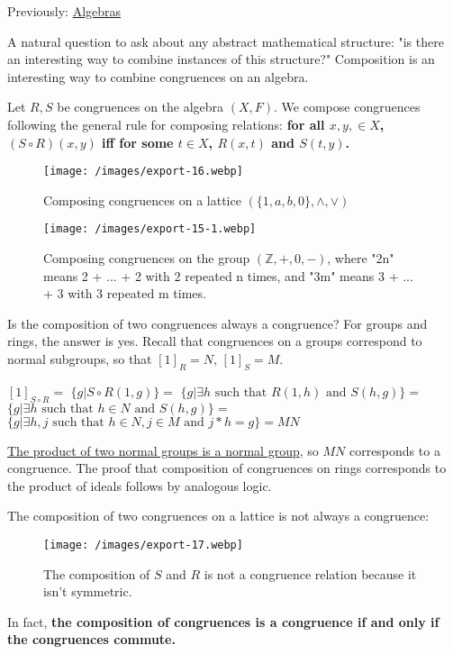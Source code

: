 \documentclass{article}
\begin{document}
Previously: \href{/posts/2021-04-02-congruences.html}{Algebras}

A natural question to ask about any abstract mathematical structure: "is there an interesting way to combine instances of this structure?" Composition is an interesting way to combine congruences on an algebra.

Let $R, S$ be congruences on the algebra $(X, F)$. We compose congruences following the general rule for composing relations: \textbf{for all $x, y, \in X$, $(S \circ R)(x, y)$ iff for some $t \in X$, $R(x, t)$ and $S(t, y)$.}

\begin{figure}
\texttt{[image: /images/export-16.webp]}
\caption{Composing congruences on a lattice $(\{1, a, b, 0\}, \land, \lor)$}
\end{figure}

\begin{figure}
\texttt{[image: /images/export-15-1.webp]}
\caption{Composing congruences on the group $(\mathbb{Z}, +, 0, -)$, where "2n" means 2 + ... + 2 with 2 repeated n times, and "3m" means 3 + ... + 3 with 3 repeated m times.}
\end{figure}

Is the composition of two congruences always a congruence? For groups and rings, the answer is yes. Recall that congruences on a groups correspond to normal subgroups, so that $[1]_R = N$, $[1]_S = M$.

$[1]_{S \circ R} =$
$\{g | S \circ R (1, g)\} =$
$\{g | \exists h \text{ such that } R(1, h) \text{ and } S(h, g)\} =$
$\{g | \exists h \text{ such that } h \in N \text{ and } S(h, g)\} =$
$\{g | \exists h, j \text{ such that } h \in N, j \in M \text{ and } j \ast h = g\} = MN$

\href{https://math.stackexchange.com/questions/991008/showing-the-product-of-two-normal-subgroups-is-normal}{The product of two normal groups is a normal group}, so $MN$ corresponds to a congruence. The proof that composition of congruences on rings corresponds to the product of ideals follows by analogous logic.

The composition of two congruences on a lattice is not always a congruence:

\begin{figure}
  \texttt{[image: /images/export-17.webp]}
  \caption{The composition of $S$ and $R$ is not a congruence relation because it isn't symmetric.}
  \end{figure}

In fact, \textbf{the composition of congruences is a congruence if and only if the congruences commute.}
\end{document}
